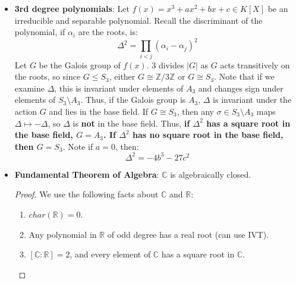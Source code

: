 \documentclass[11pt, oneside]{amsart}   	%
\theoremstyle{definition}
\begin{document}
\begin{itemize}
	
	\item \textbf{3rd degree polynomials}: Let $f(x) = x^3 + ax^2 + bx + c\in K[X]$ be an irreducible and separable polynomial. Recall the discriminant of the 
	polynomial, if $\alpha_i$ are the roots, is:
	$$
		\Delta^2 = \prod_{i < j}(\alpha_i - \alpha_j)^2
	$$
	Let $G$ be the Galois group of $f(x)$. 3 divides $|G|$ as $G$ acts transitively on the roots, so since $G \leq S_3$, either $G\cong \mathbb Z / 
	3\mathbb Z$ or $G\cong S_3$. Note that if we examine $\Delta$, this is invariant under elements of $A_3$ and changes sign under elements of 
	$S_3\setminus A_3$. Thus, if the Galois group is $A_3$, $\Delta$ is invariant under the action $G$ and lies in the base field. If $G \cong S_3$, then 
	any $\sigma\in S_3\setminus A_3$ maps $\Delta\mapsto -\Delta$, so $\Delta$ is \textbf{not} in the base field. Thus, \textbf{if $\Delta^2$ has a square 
	root in the base field, $G = A_3$. If $\Delta^2$ has no square root in the base field, then $G = S_3$}. Note if $a = 0$, then:
	$$
		\Delta^2 = -4b^3 - 27c^2
	$$
	
	\item \textbf{Fundamental Theorem of Algebra}: $\mathbb C$ is algebraically closed.
	
	\begin{proof}
	
		We use the following facts about $\mathbb C$ and $\mathbb R$:
		
			\begin{enumerate}
			
				\item $char(\mathbb R) = 0$.
				
				\item Any polynomial in $\mathbb R$ of odd degree has a real root (can use IVT).
				
				\item $[\mathbb C : \mathbb R] = 2$, and every element of $\mathbb C$ has a square root in $\mathbb C$. 
			
			\end{enumerate}
			

\end{proof}
\end{itemize}
\end{document}
